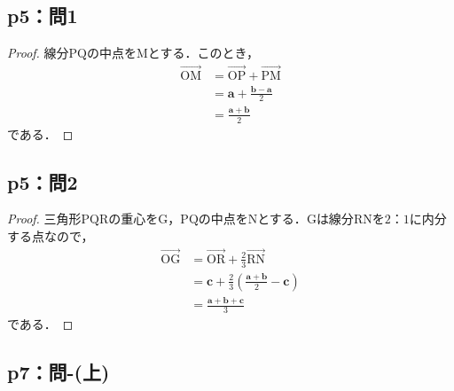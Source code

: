 \documentclass[uplatex,dvipdfmx,a4paper,10pt,fleqn]{jsarticle}
\begin{document}
\subsection*{p5：問1}

\begin{tleftbar}
    \begin{proof}
		線分$\mathrm{PQ}$の中点を$\mathrm{M}$とする．このとき，
		\begin{align*}
		\overrightarrow{\mathrm{OM}} & = \overrightarrow{\mathrm{OP}} + \overrightarrow{\mathrm{PM}} \\
		& = \bm{a} + \frac{\bm{b}-\bm{a}}{2} \\
		& = \frac{\bm{a}+\bm{b}}{2}
		\end{align*}
		である．
	\end{proof}
\end{tleftbar}
\subsection*{p5：問2}
\begin{tleftbar}
	\begin{proof}
		三角形$\mathrm{PQR}$の重心を$\mathrm{G}$，$\mathrm{PQ}$の中点を$\mathrm{N}$とする．$\mathrm{G}$は線分$\mathrm{RN}$を$2：1$に内分する点なので，
		\begin{align*}
			\overrightarrow{\mathrm{OG}} &= \overrightarrow{\mathrm{OR}} + \frac{2}{3} \overrightarrow{\mathrm{RN}} \\
			& = \bm{c}+ \frac{2}{3} \left (\frac{\bm{a}+\bm{b}}{2}-\bm{c} \right) \\
			& = \frac{\bm{a}+\bm{b}+\bm{c}}{3}
		\end{align*}
		である．
	\end{proof}
\end{tleftbar}

\newpage

\subsection*{p7：問-(上)}
\end{document}
